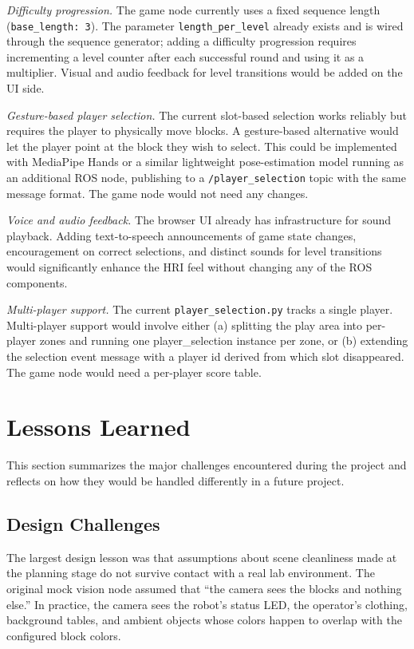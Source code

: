 \documentclass[conference]{IEEEtran}
\begin{document}
\textit{Difficulty progression.} The game node currently uses a fixed
sequence length (\texttt{base\_length: 3}). The parameter
\texttt{length\_per\_level} already exists and is wired through the
sequence generator; adding a difficulty progression requires
incrementing a level counter after each successful round and using
it as a multiplier. Visual and audio feedback for level transitions
would be added on the UI side.

\textit{Gesture-based player selection.} The current slot-based
selection works reliably but requires the player to physically move
blocks. A gesture-based alternative would let the player point at
the block they wish to select. This could be implemented with
MediaPipe Hands or a similar lightweight pose-estimation model
running as an additional ROS node, publishing to a
\texttt{/player\_selection} topic with the same message format. The
game node would not need any changes.

\textit{Voice and audio feedback.} The browser UI already has
infrastructure for sound playback. Adding text-to-speech announcements
of game state changes, encouragement on correct selections, and
distinct sounds for level transitions would significantly enhance the
HRI feel without changing any of the ROS components.

\textit{Multi-player support.} The current
\texttt{player\_selection.py} tracks a single player. Multi-player
support would involve either (a) splitting the play area into per-player
zones and running one player\_selection instance per zone, or
(b) extending the selection event message with a player id derived from
which slot disappeared. The game node would need a per-player score
table.

\section{Lessons Learned}
\label{sec:lessons}

This section summarizes the major challenges encountered during the
project and reflects on how they would be handled differently in a
future project.

\subsection{Design Challenges}

The largest design lesson was that assumptions about scene cleanliness
made at the planning stage do not survive contact with a real lab
environment. The original mock vision node assumed that ``the camera
sees the blocks and nothing else.'' In practice, the camera sees the
robot's status LED, the operator's clothing, background tables, and
ambient objects whose colors happen to overlap with the configured
block colors.
\end{document}
